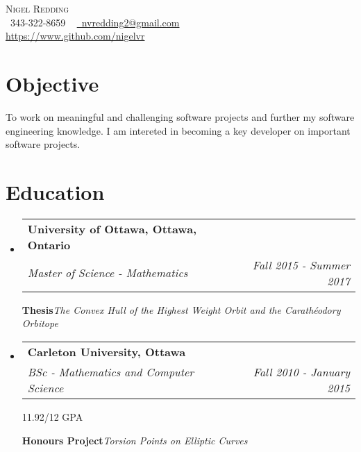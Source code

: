 \documentclass[letterpaper,11pt]{article}
\makeatletter
\newcommand{\resumeSubheading}[4]{
  \vspace{-2pt}\item
    \begin{tabular*}{1.0\textwidth}[t]{l@{\extracolsep{\fill}}r}
      \textbf{#1} & \textbf{\small #2} \\
      \textit{\small#3} & \textit{\small #4} \\
    \end{tabular*}\vspace{-7pt}
}
\newcommand{\resumeSubHeadingListStart}{\begin{itemize}[leftmargin=0.0in, label={}]}
\newcommand{\resumeSubHeadingListEnd}{\end{itemize}}
\makeatother
\begin{document}
\begin{center}
    {\Huge \scshape Nigel Redding} \\ \vspace{1pt}
    \small
    \raisebox{-0.1\height}\faPhone\ 343-322-8659 ~
    \href{mailto:youremail@gmail.com}{\faEnvelope\ nvredding2@gmail.com} ~ \\
    \href{github}{https://www.github.com/nigelvr} ~
\end{center}


\section{Objective}
  \small{To work on meaningful and challenging software projects and further my software engineering knowledge. I
  am intereted in becoming a key developer on important software projects.}
\vspace{-5pt}


\section{Education}
  \resumeSubHeadingListStart
    \resumeSubheading
      {University of Ottawa, Ottawa, Ontario}{}
      {Master of Science - Mathematics}{Fall 2015 - Summer 2017}

      \small{\textbf{Thesis}}\emph{The Convex Hull of the Highest Weight Orbit and the Carathéodory Orbitope}
      
    \resumeSubheading
      {Carleton University, Ottawa}{}
      {BSc - Mathematics and Computer Science}{Fall 2010 - January 2015}

      {11.92/12 GPA}{}

      \small{\textbf{Honours Project}}\emph{Torsion Points on Elliptic Curves}
      
  \resumeSubHeadingListEnd
\vspace{-5pt}

\end{document}
